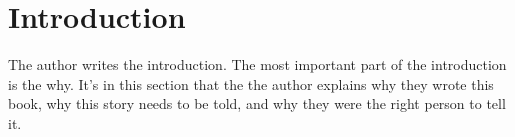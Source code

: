 \documentclass[../workbook]{subfiles}
\begin{document}
{}%

\section*{Introduction}

\parbox{\textwidth}{

    \raggedright
    \setlength{\parskip}{1.25em}

    \par{
        The author writes the introduction.
        The most important part of the introduction is the why.
        It’s in this section that the the author explains why they wrote this book,
        why this story needs to be told, and why they were the right person to tell it.
        
    }
}
\end{document}
